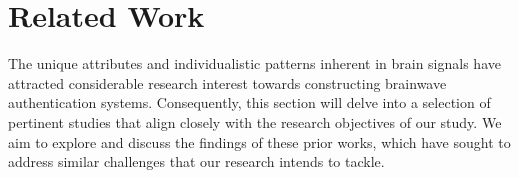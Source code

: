 \chapter{Related Work}
\label{ch:Related Work}
The unique attributes and individualistic patterns inherent in brain signals have attracted considerable research interest towards constructing brainwave authentication systems. Consequently, this section will delve into a selection of pertinent studies that align closely with the research objectives of our study. We aim to explore and discuss the findings of these prior works, which have sought to address similar challenges that our research intends to tackle. 

